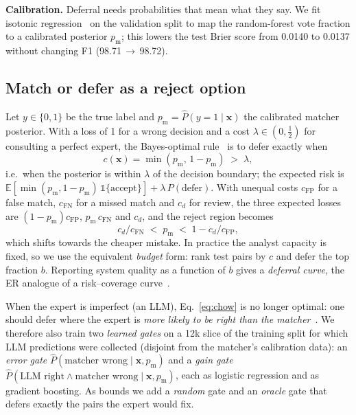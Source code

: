\documentclass[conference]{IEEEtran}
\newcommand{\pyes}{p_{\mathrm{m}}}
\newcommand{\conf}{c}
\newcommand{\defer}{\mathrm{defer}}
\begin{document}
\textbf{Calibration.} Deferral needs probabilities that mean what they say. We fit isotonic regression~\cite{niculescu2005calibration} on the validation split to map the random-forest vote fraction to a calibrated posterior $\pyes$; this lowers the test Brier score from 0.0140 to 0.0137 without changing F1 (98.71\,$\rightarrow$\,98.72).

\subsection{Match or defer as a reject option}
Let $y\in\{0,1\}$ be the true label and $\pyes=\hat P(y{=}1\mid\mathbf{x})$ the calibrated matcher posterior. With a loss of 1 for a wrong decision and a cost $\lambda\in(0,\tfrac12)$ for consulting a perfect expert, the Bayes-optimal rule~\cite{chow1970,bishop2006} is to defer exactly when
\begin{equation}
\conf(\mathbf{x}) = \min(\pyes,\,1-\pyes) \;>\; \lambda ,
\label{eq:chow}
\end{equation}
i.e.\ when the posterior is within $\lambda$ of the decision boundary; the expected risk is $\mathbb{E}[\min(\pyes,1-\pyes)\,\mathbb{1}\{\text{accept}\}]+\lambda\,P(\defer)$. With unequal costs $c_{\mathrm{FP}}$ for a false match, $c_{\mathrm{FN}}$ for a missed match and $c_d$ for review, the three expected losses are $(1-\pyes)c_{\mathrm{FP}}$, $\pyes\,c_{\mathrm{FN}}$ and $c_d$, and the reject region becomes
\begin{equation}
c_d/c_{\mathrm{FN}} \;<\; \pyes \;<\; 1-c_d/c_{\mathrm{FP}} ,
\label{eq:region}
\end{equation}
which shifts towards the cheaper mistake. In practice the analyst capacity is fixed, so we use the equivalent \emph{budget} form: rank test pairs by $\conf$ and defer the top fraction $b$. Reporting system quality as a function of $b$ gives a \emph{deferral curve}, the ER analogue of a risk--coverage curve~\cite{geifman2017selective}.

When the expert is imperfect (an LLM), Eq.~\eqref{eq:chow} is no longer optimal: one should defer where the expert is \emph{more likely to be right than the matcher}~\cite{mozannar2020defer}. We therefore also train two \emph{learned gates} on a 12k slice of the training split for which LLM predictions were collected (disjoint from the matcher's calibration data): an \emph{error gate} $\hat P(\text{matcher wrong}\mid\mathbf{x},\pyes)$ and a \emph{gain gate} $\hat P(\text{LLM right}\wedge\text{matcher wrong}\mid\mathbf{x},\pyes)$, each as logistic regression and as gradient boosting. As bounds we add a \emph{random} gate and an \emph{oracle} gate that defers exactly the pairs the expert would fix.
\end{document}
